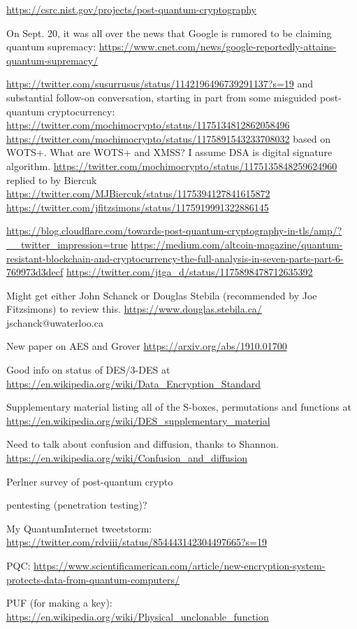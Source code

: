 \documentclass[%
 aip,
 jmp,%
 amsmath,amssymb,
 reprint,%
]{revtex4-1}
\begin{document}
\url{https://csrc.nist.gov/projects/post-quantum-cryptography}

On Sept. 20, it was all over the news that Google is rumored to be
claiming quantum supremacy:
\url{https://www.cnet.com/news/google-reportedly-attains-quantum-supremacy/}

\url{https://twitter.com/susurrusus/status/1142196496739291137?s=19}
and substantial follow-on conversation, starting in part from some
misguided post-quantum cryptocurrency:
\url{https://twitter.com/mochimocrypto/status/1175134812862058496}
\url{https://twitter.com/mochimocrypto/status/1175891543233708032}
based on WOTS+.
What are WOTS+ and XMSS?  I assume DSA is digital signature algorithm.
\url{https://twitter.com/mochimocrypto/status/1175135848259624960}
replied to by Biercuk
\url{https://twitter.com/MJBiercuk/status/1175394127841615872}
\url{https://twitter.com/jfitzsimons/status/1175919991322886145}

\url{https://blog.cloudflare.com/towards-post-quantum-cryptography-in-tls/amp/?__twitter_impression=true}
\url{https://medium.com/altcoin-magazine/quantum-resistant-blockchain-and-cryptocurrency-the-full-analysis-in-seven-parts-part-6-769973d3decf}
\url{https://twitter.com/jtga_d/status/1175898478712635392}

Might get either John Schanck or Douglas Stebila (recommended by Joe
Fitzsimons) to review this.
\url{https://www.douglas.stebila.ca/}
jschanck@uwaterloo.ca

New paper on AES and Grover
\url{https://arxiv.org/abs/1910.01700}

Good info on status of DES/3-DES at
\url{https://en.wikipedia.org/wiki/Data_Encryption_Standard}

Supplementary material listing all of the S-boxes, permutations and
functions at
\url{https://en.wikipedia.org/wiki/DES_supplementary_material}

Need to talk about confusion and diffusion, thanks to Shannon.
\url{https://en.wikipedia.org/wiki/Confusion_and_diffusion}

Perlner survey of post-quantum crypto

pentesting (penetration testing)?

My QuantumInternet tweetstorm:
\url{https://twitter.com/rdviii/status/854443142304497665?s=19}

PQC:
\url{https://www.scientificamerican.com/article/new-encryption-system-protects-data-from-quantum-computers/}

PUF (for making a key):
\url{https://en.wikipedia.org/wiki/Physical_unclonable_function}
\end{document}

